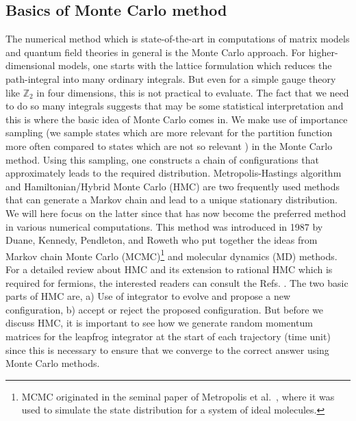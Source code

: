 \documentclass[letter,11pt]{article}
\begin{document}
\subsection{Basics of Monte Carlo method}
The numerical method which is state-of-the-art in computations of matrix models and quantum field theories in general is the Monte Carlo approach. For higher-dimensional models, one starts with the lattice formulation which reduces the path-integral into many ordinary integrals. But even for a simple
gauge theory like $\mathbb{Z}_{2}$ in four dimensions, this is not practical to evaluate. 
The fact that we need to do so many integrals suggests that may be some statistical 
interpretation and this is where the basic idea of Monte Carlo comes in. We make use of
importance sampling (we sample states which are more relevant for the partition function more often compared to states which are not so relevant ) in the Monte Carlo
method. Using this sampling, one constructs a chain of configurations that approximately leads to the required distribution. Metropolis-Hastings algorithm and Hamiltonian/Hybrid Monte Carlo (HMC) 
are two frequently used methods that can generate a Markov chain and lead to a unique stationary distribution. We will here focus on the latter since that has now become the preferred method in various numerical computations. This method was introduced in 
1987 by Duane, Kennedy, Pendleton, and Roweth \cite{Duane:1987de} who put together the ideas from Markov chain Monte Carlo (MCMC)\footnote{MCMC originated in the seminal paper of Metropolis et al.~\cite{Metropolis:1953am}, where it was used to simulate the state distribution for a system of ideal molecules.} 
and molecular dynamics (MD) methods. 
For a detailed review about HMC and its extension to rational 
HMC which is required for fermions, the interested readers 
can consult the Refs. \cite{Hanada:2018fnp,Joseph:2019zer}. 
The two basic parts of HMC are, a) Use of integrator to evolve and propose a new configuration, b) accept or reject
the proposed configuration. But before we discuss HMC, 
it is important to see how we generate random momentum 
matrices for the leapfrog integrator 
at the start of each trajectory (time unit) since 
this is necessary to ensure that we converge to the 
correct answer using Monte Carlo methods. 
\end{document}
